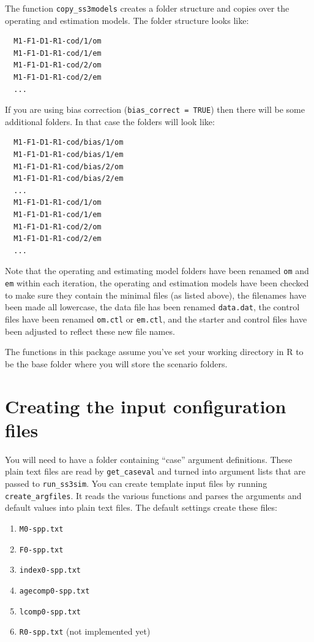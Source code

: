 \documentclass[12pt]{article}
\begin{document}

The function \texttt{copy\_ss3models} creates a folder structure and copies 
over the operating and estimation models. The folder structure looks like:

\begin{verbatim}
  M1-F1-D1-R1-cod/1/om
  M1-F1-D1-R1-cod/1/em
  M1-F1-D1-R1-cod/2/om
  M1-F1-D1-R1-cod/2/em
  ...
\end{verbatim}

\noindent
If you are using bias correction (\texttt{bias\_correct = TRUE}) then there 
will be some additional folders. In that case the folders will look like:

\begin{verbatim}
  M1-F1-D1-R1-cod/bias/1/om
  M1-F1-D1-R1-cod/bias/1/em
  M1-F1-D1-R1-cod/bias/2/om
  M1-F1-D1-R1-cod/bias/2/em
  ...
  M1-F1-D1-R1-cod/1/om
  M1-F1-D1-R1-cod/1/em
  M1-F1-D1-R1-cod/2/om
  M1-F1-D1-R1-cod/2/em
  ...
\end{verbatim}

\noindent
Note that the operating and estimating model folders have been renamed
\texttt{om} and \texttt{em} within each iteration, the operating and estimation 
models have been checked to make sure they contain the minimal files (as listed 
above), the filenames have been made all lowercase, the data file has been 
renamed \texttt{data.dat}, the control files have been renamed \texttt{om.ctl} 
or \texttt{em.ctl}, and the starter and control files have been adjusted to 
reflect these new file names.

The functions in this package assume you've set your working directory in R to 
be the base folder where you will store the scenario folders.

\section*{Creating the input configuration files}
You will need to have a folder containing ``case'' argument definitions. These 
plain text files are read by \texttt{get\_caseval} and turned into argument 
lists that are passed to \texttt{run\_ss3sim}. You can create template input 
files by running \texttt{create\_argfiles}. It reads the various functions and 
parses the arguments and default values into plain text files. The default 
settings create these files:

\begin{enumerate}
  \item \texttt{M0-spp.txt}
  \item \texttt{F0-spp.txt}
  \item \texttt{index0-spp.txt}
  \item \texttt{agecomp0-spp.txt}
  \item \texttt{lcomp0-spp.txt}
  \item \texttt{R0-spp.txt} (not implemented yet)
\end{enumerate}
\end{document}
